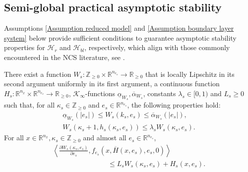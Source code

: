 \subsection{Semi-global practical asymptotic stability}
Assumptions \ref{Assumption reduced model} and \ref{Assumption boundary layer system} below provide sufficient conditions to guarantee asymptotic stability properties for $\mathcal{H}_r$ and $\mathcal{H}_{bl}$, respectively, which align with those commonly encountered in the NCS literature, see \cite{carnevale_stability,SPNCS}.
%
\begin{assum}
 There exist a function $W_s: \mathbb{Z}_{\geq 0}\times \mathbb{R}^{n_{e_s}} \to \mathbb{R}_{\geq 0}$ that is locally Lipschitz in its second argument uniformly in its first argument, a continuous function $H_s : \mathbb{R}^{n_x}\times\mathbb{R}^{n_{e_s}} \rightarrow \mathbb{R}_{\geq 0} $, $\mathcal{K}_{\infty}$-functions $ \underline{\alpha}_{W_s},\overline{\alpha }_{W_s}  $, constants $\lambda_s \in [0,1)$ and $ L_s \geq 0$ such that, for all $ \kappa_s \in \mathbb{Z}_{\geq 0}$ and $e_s \in \mathbb{R}^{n_{e_s}}$, the following properties hold:
\begin{align}
    \underline{\alpha}_{W_s}\left(\left|  {e_s}  \right|\right) \leq {W_s}(k_s, {e_s}) \leq \overline{\alpha }_{W_s}\left(\left|   {e_s}  \right|\right) ,\label{eqn: NCS assumption Ws sandwich bound}
    \\
    {W_s}(\kappa_s + 1, h_s(\kappa_s, e_s)) \leq \lambda_s {W_s}(\kappa_s, {e_s}). \label{eqn: NCS assumption Ws jump}
\end{align}
For all $x \in \mathbb{R}^{n_x}, \kappa_s \in \mathbb{Z}_{\geq 0}$ and almost all ${e_s} \in \mathbb{R}^{n_{e_s}}$,
\begin{multline}
    \left< \tfrac{\partial {W_s}(\kappa_s,{e_s})}{\partial {e_s}}, f_{e_s}(x,\overline{H}(x,e_s),e_s, 0)\right> \
    \\
    \phantom{aaaaaaaaaaaaaaa}   \leq  L_s {W_s}(\kappa_s, e_s)  + H_s(x,e_s).
    \label{eqn: NCS Ws dot}
\end{multline}

\end{assum}
